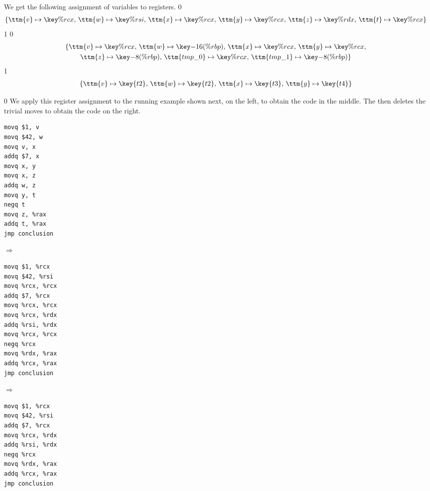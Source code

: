 \documentclass[7x10]{TimesAPriori_MIT}%
\def\racketEd{0}
\def\pythonEd{1}
\def\edition{1}
\def\xeightysixEd{0}
\def\riscvEd{1}
\def\architecture{1}
\newcommand{\pythonColor}[0]{}
\numberwithin{theorem}{chapter}
\numberwithin{definition}{chapter}
\numberwithin{equation}{chapter}
\begin{document}
We get the following assignment of variables to registers.
{\if\edition\racketEd
\begin{gather*}
  \{ \ttm{v} \mapsto \key{\%rcx}, \,
     \ttm{w} \mapsto \key{\%rsi}, \,
     \ttm{x} \mapsto \key{\%rcx}, \,
     \ttm{y} \mapsto \key{\%rcx}, \,
     \ttm{z} \mapsto \key{\%rdx}, \,
     \ttm{t} \mapsto \key{\%rcx} \}
\end{gather*}
\fi}
{\if\edition\pythonEd\pythonColor
{\if\architecture\xeightysixEd
\begin{gather*}
  \{ \ttm{v} \mapsto \key{\%rcx}, \,
     \ttm{w} \mapsto \key{-16(\%rbp)}, \,
     \ttm{x} \mapsto \key{\%rcx}, \,
     \ttm{y} \mapsto \key{\%rcx}, \\
     \ttm{z} \mapsto \key{-8(\%rbp)}, \,
     \ttm{tmp\_0} \mapsto \key{\%rcx}, \,
     \ttm{tmp\_1} \mapsto \key{-8(\%rbp)} \}
\end{gather*}
\fi}
{\if\architecture\riscvEd
\begin{gather*}
  \{ \ttm{v} \mapsto \key{t2}, \,
     \ttm{w} \mapsto \key{t2}, \,
     \ttm{x} \mapsto \key{t3}, \,
     \ttm{y} \mapsto \key{t4}
  \}
\end{gather*}
\fi}
\fi}
{\if\edition\racketEd
We apply this register assignment to the running example shown next,
on the left, to obtain the code in the middle.  The
 then deletes the trivial moves to obtain
the code on the right.
\begin{center}  
\begin{minipage}{0.2\textwidth}
\begin{lstlisting}
movq $1, v
movq $42, w
movq v, x
addq $7, x
movq x, y
movq x, z
addq w, z
movq y, t
negq t
movq z, %rax
addq t, %rax
jmp conclusion
\end{lstlisting}
\end{minipage}
$\Rightarrow\qquad$
\begin{minipage}{0.25\textwidth}
\begin{lstlisting}
movq $1, %rcx
movq $42, %rsi
movq %rcx, %rcx
addq $7, %rcx
movq %rcx, %rcx
movq %rcx, %rdx
addq %rsi, %rdx
movq %rcx, %rcx
negq %rcx
movq %rdx, %rax
addq %rcx, %rax
jmp conclusion
\end{lstlisting}
\end{minipage}
$\Rightarrow\qquad$
\begin{minipage}{0.23\textwidth}
\begin{lstlisting}
movq $1, %rcx
movq $42, %rsi
addq $7, %rcx
movq %rcx, %rdx
addq %rsi, %rdx
negq %rcx
movq %rdx, %rax
addq %rcx, %rax
jmp conclusion
\end{lstlisting}
\end{minipage}
\end{center}
\fi}
\end{document}
